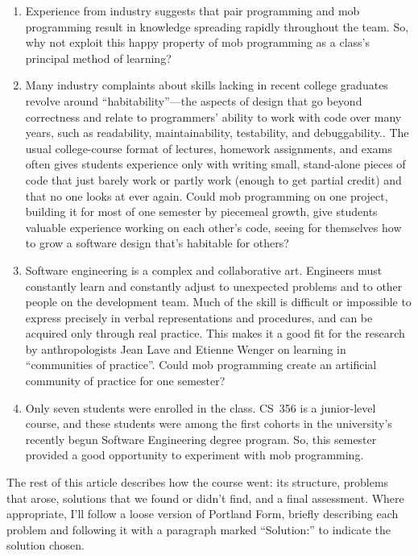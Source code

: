 \documentclass{article}
\begin{document}
\begin{enumerate}
  \item Experience from industry suggests that pair programming and mob
  programming result in knowledge spreading rapidly throughout the team.
  So, why not exploit this happy property of mob programming as a class's
  principal method of learning?

  \item Many industry complaints about skills lacking in recent college
  graduates revolve around ``habitability''---the aspects of design that
  go beyond correctness and relate to programmers' ability to work with
  code over many years, such as readability, maintainability, testability,
  and debuggability.\cite{Gabriel1996}. The usual college-course format
  of lectures, homework assignments, and exams often gives students
  experience only with writing small, stand-alone pieces of code that just
  barely work or partly work (enough to get partial credit) and that no one
  looks at ever again. Could mob programming on one project, building it for
  most of one semester by piecemeal growth, give students valuable experience
  working on each other's code, seeing for themselves how to grow a 
  software design that's habitable for others?

  \item Software engineering is a complex and collaborative art.
  Engineers must constantly learn and constantly adjust to unexpected problems
  and to other people on the development team. Much of the skill is difficult
  or impossible to express precisely in verbal representations and procedures,
  and can be acquired only through real practice. This makes it a good fit for
  the research by anthropologists Jean Lave and Etienne Wenger on learning in
  ``communities of practice''.\cite{wenger2015introduction} Could mob
  programming create an artificial community of practice for one semester?

  \item Only seven students were enrolled in the class. CS~356 is a
  junior-level course, and these students were among the first cohorts in the
  university's recently begun Software Engineering degree program. So,
  this semester provided a good opportunity to experiment with mob
  programming.
\end{enumerate}

The rest of this article describes how the course went: its structure,
problems that arose, solutions that we found or didn't find, and a final
assessment. Where appropriate, I'll follow a loose version of Portland Form,
briefly describing each problem and following it with a paragraph marked
``Solution:'' to indicate the solution chosen.
\end{document}
